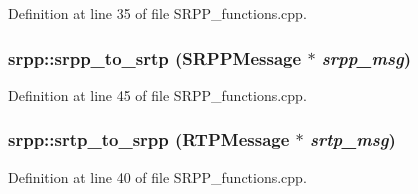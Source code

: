 Definition at line 35 of file SRPP\_\-functions.cpp.

\hypertarget{namespacesrpp_a2bf678c0bec2ec54e269523236390971}{
\subsubsection[{srpp\_\-to\_\-srtp}]{ srpp::srpp\_\-to\_\-srtp ({\bf SRPPMessage} $\ast$ {\em srpp\_\-msg})}}
\label{namespacesrpp_a2bf678c0bec2ec54e269523236390971}


Definition at line 45 of file SRPP\_\-functions.cpp.

\hypertarget{namespacesrpp_a2dc275aa82c32a995b8d9d33de00ecfa}{
\subsubsection[{srtp\_\-to\_\-srpp}]{ srpp::srtp\_\-to\_\-srpp ({\bf RTPMessage} $\ast$ {\em srtp\_\-msg})}}
\label{namespacesrpp_a2dc275aa82c32a995b8d9d33de00ecfa}


Definition at line 40 of file SRPP\_\-functions.cpp.


